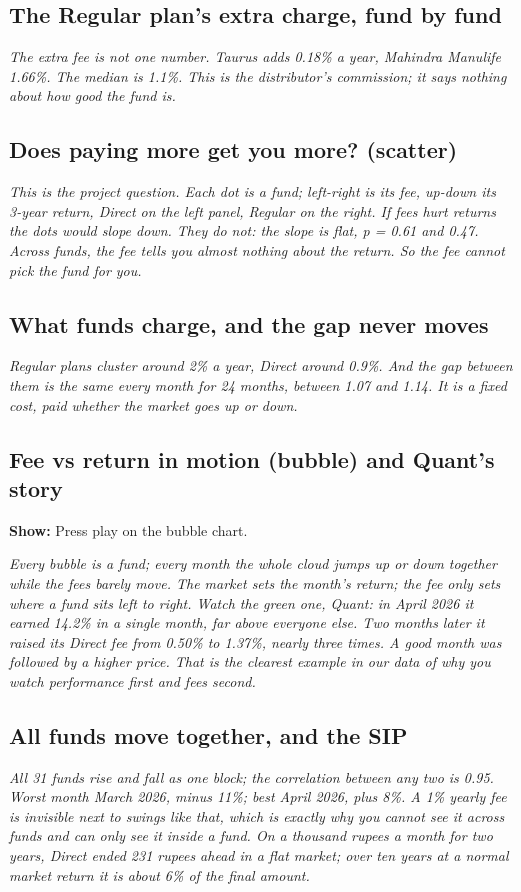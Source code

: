 \documentclass[11pt,a4paper]{article}
\newcommand{\say}[1]{\par\medskip\noindent\textcolor{black!70}{\textit{#1}}\par\medskip}
\newcommand{\onscreen}[1]{\noindent\textbf{Show:} #1\par}
\begin{document}
\subsection*{The Regular plan's extra charge, fund by fund}
\say{The extra fee is not one number. Taurus adds 0.18\% a year, Mahindra Manulife 1.66\%. The median is 1.1\%. This is the distributor's commission; it says nothing about how good the fund is.}

\subsection*{Does paying more get you more? (scatter)}
\say{This is the project question. Each dot is a fund; left-right is its fee, up-down its 3-year return, Direct on the left panel, Regular on the right. If fees hurt returns the dots would slope down. They do not: the slope is flat, p = 0.61 and 0.47. Across funds, the fee tells you almost nothing about the return. So the fee cannot pick the fund for you.}

\subsection*{What funds charge, and the gap never moves}
\say{Regular plans cluster around 2\% a year, Direct around 0.9\%. And the gap between them is the same every month for 24 months, between 1.07 and 1.14. It is a fixed cost, paid whether the market goes up or down.}

\subsection*{Fee vs return in motion (bubble) and Quant's story}
\onscreen{Press play on the bubble chart.}
\say{Every bubble is a fund; every month the whole cloud jumps up or down together while the fees barely move. The market sets the month's return; the fee only sets where a fund sits left to right. Watch the green one, Quant: in April 2026 it earned 14.2\% in a single month, far above everyone else. Two months later it raised its Direct fee from 0.50\% to 1.37\%, nearly three times. A good month was followed by a higher price. That is the clearest example in our data of why you watch performance first and fees second.}

\subsection*{All funds move together, and the SIP}
\say{All 31 funds rise and fall as one block; the correlation between any two is 0.95. Worst month March 2026, minus 11\%; best April 2026, plus 8\%. A 1\% yearly fee is invisible next to swings like that, which is exactly why you cannot see it across funds and can only see it inside a fund. On a thousand rupees a month for two years, Direct ended 231 rupees ahead in a flat market; over ten years at a normal market return it is about 6\% of the final amount.}
\end{document}
